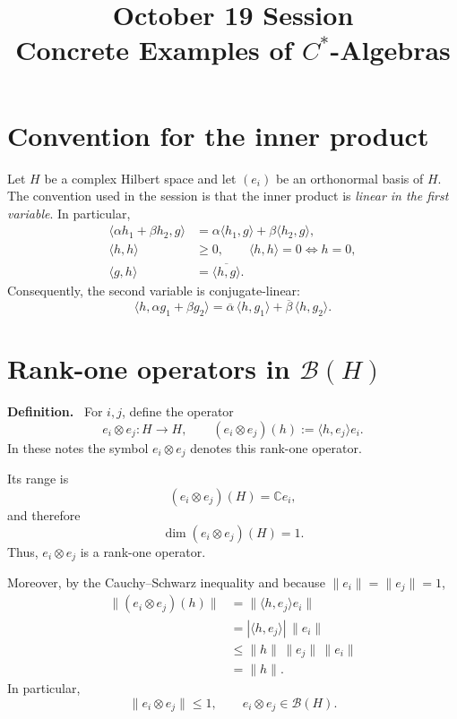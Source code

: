 \documentclass[11pt]{article}
\title{October 19 Session\\Concrete Examples of $C^*$-Algebras}
\author{}
\date{}
\newcommand{\C}{\mathbb{C}}
\newcommand{\BH}{\mathcal{B}(H)}
\newenvironment{definition}{\par\medskip\noindent\textbf{Definition.}\ }{\par\medskip}
\begin{document}
\maketitle



\section{Convention for the inner product}

Let $H$ be a complex Hilbert space and let $(e_i)$ be an orthonormal basis of $H$.
The convention used in the session is that the inner product is \emph{linear in
the first variable}. In particular,
\begin{align*}
\langle \alpha h_1+\beta h_2,g\rangle
 &=\alpha\langle h_1,g\rangle+\beta\langle h_2,g\rangle,\\
\langle h,h\rangle&\ge 0,
\qquad
\langle h,h\rangle=0\iff h=0,\\
\langle g,h\rangle&=\overline{\langle h,g\rangle}.
\end{align*}
Consequently, the second variable is conjugate-linear:
\[
\langle h,\alpha g_1+\beta g_2\rangle
=
\overline{\alpha}\,\langle h,g_1\rangle
+
\overline{\beta}\,\langle h,g_2\rangle.
\]

\section{Rank-one operators in $\mathcal{B}(H)$}

\begin{definition}
For $i,j$, define the operator
\[
 e_i\otimes e_j:H\longrightarrow H,
 \qquad
 (e_i\otimes e_j)(h):=\langle h,e_j\rangle e_i.
\]
In these notes the symbol $e_i\otimes e_j$ denotes this rank-one operator.
\end{definition}

Its range is
\[
(e_i\otimes e_j)(H)=\C e_i,
\]
and therefore
\[
\dim (e_i\otimes e_j)(H)=1.
\]
Thus, $e_i\otimes e_j$ is a rank-one operator.

Moreover, by the Cauchy--Schwarz inequality and because $\|e_i\|=\|e_j\|=1$,
\begin{align*}
\|(e_i\otimes e_j)(h)\|
 &=\|\langle h,e_j\rangle e_i\|\\
 &=|\langle h,e_j\rangle|\,\|e_i\|\\
 &\le \|h\|\,\|e_j\|\,\|e_i\|\\
 &=\|h\|.
\end{align*}
In particular,
\[
\|e_i\otimes e_j\|\le 1,
\qquad
 e_i\otimes e_j\in\BH.
\]
\end{document}
